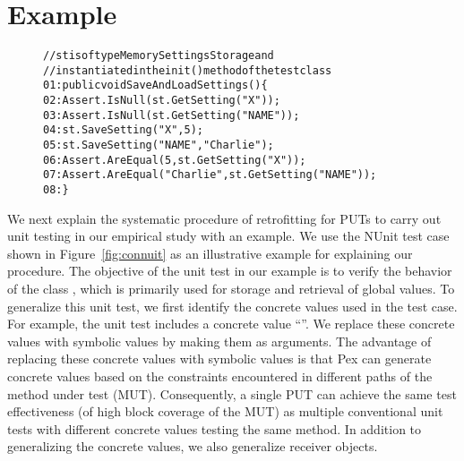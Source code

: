 \section{Example}
\label{sec:example}

\begin{figure}[t]
\begin{CodeOut}
\begin{alltt}
//st is of type MemorySettingsStorage and 
//instantiated in the init() method of the test class
01:public void SaveAndLoadSettings() \{
02:\hspace*{0.1in}Assert.IsNull(st.GetSetting("X"));
03:\hspace*{0.1in}Assert.IsNull(st.GetSetting("NAME"));
04:\hspace*{0.1in}st.SaveSetting("X", 5);
05:\hspace*{0.1in}st.SaveSetting("NAME", "Charlie");
06:\hspace*{0.1in}Assert.AreEqual(5, st.GetSetting("X"));
07:\hspace*{0.1in}Assert.AreEqual("Charlie", st.GetSetting("NAME"));
08:\}
\end{alltt}
\end{CodeOut}
\end{figure}

We next explain the systematic procedure of retrofitting for PUTs to carry out unit testing in our empirical study with an example. We use the NUnit test case 
shown in Figure~\ref{fig:connuit} as an illustrative example for explaining our procedure. 
The objective of the unit test in our example is to verify the behavior of the
class , which
is primarily used for storage and retrieval of global
values. To generalize this unit test, we first identify
the concrete values used in the test case. For example, the unit test includes a concrete  value ``''. We replace these concrete values with symbolic values by making them as arguments. The advantage 
of replacing these concrete values with symbolic values is that
Pex can generate concrete values based on the constraints
encountered in different paths of the method under test (MUT). Consequently, a single PUT can achieve the same test effectiveness (of high block coverage of the MUT) as multiple conventional unit tests with different concrete values testing the same method. In addition to generalizing the concrete values, we also generalize receiver objects. 

